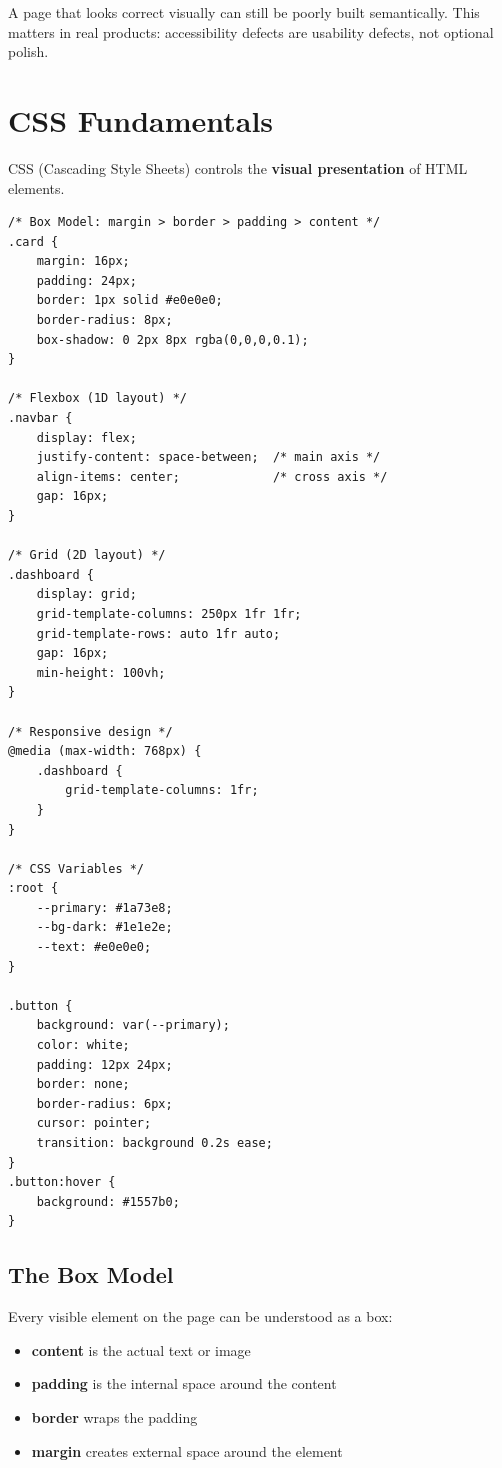 \documentclass[12pt, a4paper, oneside]{book}
\begin{document}
\begin{warningbox}
A page that looks correct visually can still be poorly built semantically. This matters in real products: accessibility defects are usability defects, not optional polish.
\end{warningbox}

\section{CSS Fundamentals}

CSS (Cascading Style Sheets) controls the \textbf{visual presentation} of HTML elements.

\begin{lstlisting}[caption={CSS core concepts}]
/* Box Model: margin > border > padding > content */
.card {
    margin: 16px;
    padding: 24px;
    border: 1px solid #e0e0e0;
    border-radius: 8px;
    box-shadow: 0 2px 8px rgba(0,0,0,0.1);
}

/* Flexbox (1D layout) */
.navbar {
    display: flex;
    justify-content: space-between;  /* main axis */
    align-items: center;             /* cross axis */
    gap: 16px;
}

/* Grid (2D layout) */
.dashboard {
    display: grid;
    grid-template-columns: 250px 1fr 1fr;
    grid-template-rows: auto 1fr auto;
    gap: 16px;
    min-height: 100vh;
}

/* Responsive design */
@media (max-width: 768px) {
    .dashboard {
        grid-template-columns: 1fr;
    }
}

/* CSS Variables */
:root {
    --primary: #1a73e8;
    --bg-dark: #1e1e2e;
    --text: #e0e0e0;
}

.button {
    background: var(--primary);
    color: white;
    padding: 12px 24px;
    border: none;
    border-radius: 6px;
    cursor: pointer;
    transition: background 0.2s ease;
}
.button:hover {
    background: #1557b0;
}
\end{lstlisting}

\subsection{The Box Model}
Every visible element on the page can be understood as a box:
\begin{itemize}[leftmargin=2em]
    \item \textbf{content} is the actual text or image
    \item \textbf{padding} is the internal space around the content
    \item \textbf{border} wraps the padding
    \item \textbf{margin} creates external space around the element
\end{itemize}
\end{document}
